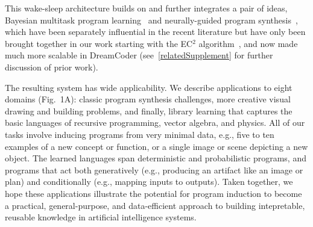 \documentclass[12pt]{article}
\begin{document}
%
%
This wake-sleep architecture builds on and further integrates a pair of ideas, Bayesian multitask program learning~\cite{Dechter:2013:BLV:2540128.2540316,DBLP:conf/icml/LiangJK10,lake2015human} and neurally-guided program synthesis~\cite{balog2016deepcoder,devlin2017robustfill}, which have been separately influential in the recent literature but have only been brought together in our work starting with the EC$^2$ algorithm~\cite{ecc}, and now made much more scalable in DreamCoder (see~\ref{relatedSupplement} for further discussion of prior work).

The resulting system has wide applicability. We describe applications to eight domains (Fig.~1A): classic program synthesis challenges, more creative visual drawing and building problems, and finally, library learning that captures the basic languages of recursive programming, vector algebra, and physics.
All of our tasks involve inducing programs from very minimal data, e.g., five to ten examples of a new concept or function, or a single image or scene depicting a new object.  The learned 
languages span deterministic and probabilistic programs, and programs that act both generatively (e.g., producing an artifact like an image or plan) and conditionally (e.g., mapping inputs to outputs). Taken together, we hope these applications illustrate the potential for program induction to become a practical, general-purpose, and data-efficient approach to building intepretable, reusable knowledge in artificial intelligence systems.
\end{document}
